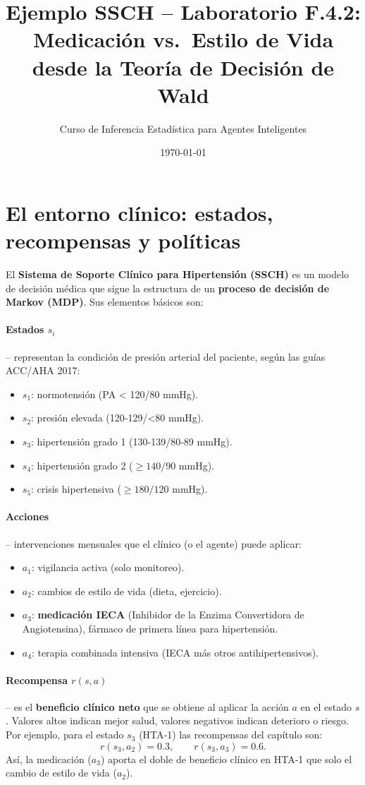 \documentclass[12pt,a4paper]{article}
\title{\textbf{Ejemplo SSCH -- Laboratorio F.4.2:}\\ Medicación vs.\ Estilo de Vida\\ desde la Teoría de Decisión de Wald}
\author{Curso de Inferencia Estadística para Agentes Inteligentes}
\date{\today}
\begin{document}
	\maketitle
	
	\section{El entorno clínico: estados, recompensas y políticas}
	
	El \textbf{Sistema de Soporte Clínico para Hipertensión (SSCH)} es un modelo de decisión médica que sigue la estructura de un \textbf{proceso de decisión de Markov (MDP)}. Sus elementos básicos son:
	
	\paragraph{Estados \(s_i\)} – representan la condición de presión arterial del paciente, según las guías ACC/AHA 2017:
	\begin{itemize}
		\item \(s_1\): normotensión (PA < 120/80 mmHg).
		\item \(s_2\): presión elevada (120‑129/<80 mmHg).
		\item \(s_3\): hipertensión grado 1 (130‑139/80‑89 mmHg).
		\item \(s_4\): hipertensión grado 2 (\(\ge 140/90\) mmHg).
		\item \(s_5\): crisis hipertensiva (\(\ge 180/120\) mmHg).
	\end{itemize}
	
	\paragraph{Acciones} – intervenciones mensuales que el clínico (o el agente) puede aplicar:
	\begin{itemize}
		\item \(a_1\): vigilancia activa (solo monitoreo).
		\item \(a_2\): cambios de estilo de vida (dieta, ejercicio).
		\item \(a_3\): \textbf{medicación IECA} (Inhibidor de la Enzima Convertidora de Angiotensina), fármaco de primera línea para hipertensión.
		\item \(a_4\): terapia combinada intensiva (IECA más otros antihipertensivos).
	\end{itemize}
	
	\paragraph{Recompensa \(r(s,a)\)} – es el \textbf{beneficio clínico neto} que se obtiene al aplicar la acción \(a\) en el estado \(s\). Valores altos indican mejor salud, valores negativos indican deterioro o riesgo. Por ejemplo, para el estado \(s_3\) (HTA‑1) las recompensas del capítulo son:
	\[
	r(s_3,a_2) = 0.3,\qquad r(s_3,a_3) = 0.6.
	\]
	Así, la medicación (\(a_3\)) aporta el doble de beneficio clínico en HTA‑1 que solo el cambio de estilo de vida (\(a_2\)).
	
\end{document}
